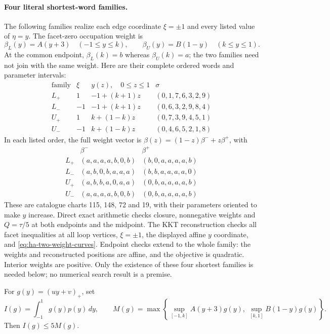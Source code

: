 \paragraph{Four literal shortest-word families.}
The following families realize each edge coordinate $\xi=\pm1$ and every
listed value of $\eta=y$. The facet-zero occupation weight is
\begin{equation}\label{eq:ha-two-weight-curves}
 \beta_L(y)=A(y+3)\quad(-1\leq y\leq k),\qquad
 \beta_U(y)=B(1-y)\quad(k\leq y\leq1).
\end{equation}
At the common endpoint, $\beta_L(k)=b$ whereas $\beta_U(k)=a$; the two
families need not join with the same weight.
Here are their complete ordered words and parameter intervals:
\[
\begin{array}{c|c|c|l}
 \text{family}&\xi& y(z),\quad0\leq z\leq1&\sigma\\ \hline
 L_+& 1&-1+(k+1)z&(0,1,7,6,3,2,9)\\
 L_-&-1&-1+(k+1)z&(0,6,3,2,9,8,4)\\
 U_+& 1& k+(1-k)z&(0,7,3,9,4,5,1)\\
 U_-&-1& k+(1-k)z&(0,4,6,5,2,1,8)
\end{array}
\]
In each listed order, the full weight vector is
$\beta(z)=(1-z)\beta^-+z\beta^+$, with
\[
\begin{array}{c|c|c}
 &\beta^-&\beta^+\\ \hline
 L_+&(a,a,a,a,b,0,b)&(b,0,a,a,a,a,b)\\
 L_-&(a,b,0,b,a,a,a)&(b,b,a,a,a,a,0)\\
 U_+&(a,b,b,a,0,a,a)&(0,b,a,a,a,a,b)\\
 U_-&(a,a,a,a,b,0,b)&(0,b,a,a,a,a,b)
\end{array}
\]
These are catalogue charts 115, 148, 72 and 19, with their parameters oriented
to make $y$ increase. Direct exact arithmetic checks closure, nonnegative
weights and $Q=\tau/5$ at both endpoints and the midpoint. The KKT
reconstruction checks all facet inequalities at all loop vertices,
$\xi=\pm1$, the displayed affine $y$ coordinate, and
\eqref{eq:ha-two-weight-curves}. Endpoint checks extend to the whole family:
the weights and reconstructed positions are affine, and the objective is
quadratic. Interior weights are positive. Only the existence of these four
shortest families is needed below; no numerical search result is a premise.

\begin{lemma}\label{lem:ha-scalar-amplification}
For $g(y)=(uy+v)_+$, set
\[
 I(g)=\int_{-1}^1g(y)p(y)\,dy,\qquad
 M(g)=\max\left\{\sup_{[-1,k]}A(y+3)g(y),\
                       \sup_{[k,1]}B(1-y)g(y)\right\}.
\]
Then $I(g)\leq5M(g)$.
\end{lemma}

